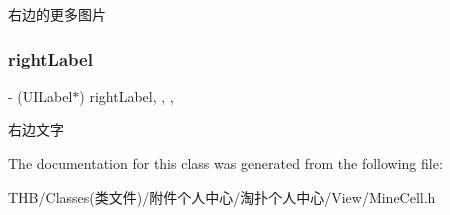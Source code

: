 右边的更多图片 \mbox{\label{interface_mine_cell_a066382eb97dcf9040ce518f9d50a3e33}} 
\subsubsection{\texorpdfstring{right\+Label}{rightLabel}}
{\footnotesize\ttfamily -\/ (U\+I\+Label$\ast$) right\+Label\hspace{0.3cm}{\ttfamily [read]}, {\ttfamily [write]}, {\ttfamily [nonatomic]}, {\ttfamily [strong]}}

右边文字 

The documentation for this class was generated from the following file\+:\begin{DoxyCompactItemize}
\item 
T\+H\+B/\+Classes(类文件)/附件个人中心/淘扑个人中心/\+View/Mine\+Cell.\+h\end{DoxyCompactItemize}
